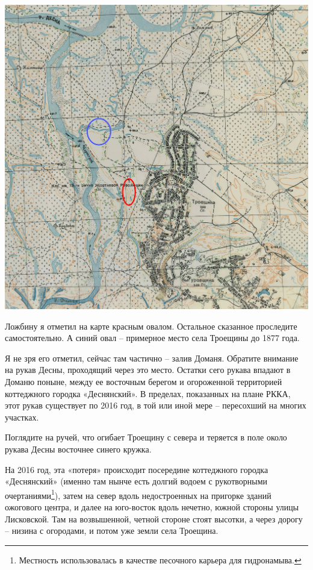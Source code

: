 \begin{center}
\includegraphics[width=\linewidth]{chast-gorodki/gnilusha/rkka.jpg}
\end{center}

Ложбину я отметил на карте красным овалом. Остальное сказанное проследите самостоятельно. А синий овал – примерное место села Троещины до 1877 года.

Я не зря его отметил, сейчас там частично – залив Доманя. Обратите внимание на рукав Десны, проходящий через это место. Остатки сего рукава впадают в Доманю поныне, между ее восточным берегом и огороженной территорией коттеджного городка «Деснянский». В пределах, показанных на плане РККА, этот рукав существует по 2016 год, в той или иной мере – пересохший на многих участках.

Поглядите на ручей, что огибает Троещину с севера и теряется в поле около рукава Десны восточнее синего кружка. 

На 2016 год, эта «потеря» происходит посередине коттеджного городка «Деснянский» (именно там нынче есть долгий водоем с рукотворными очертаниями\footnote{Местность использовалась в качестве песочного карьера для гидронамыва.}), затем на север вдоль недостроенных на пригорке зданий ожогового центра, и далее на юго-восток вдоль нечетно, южной стороны улицы Лисковской. Там на возвышенной, четной стороне стоят высотки, а через дорогу – низина с огородами, и потом уже земли села Троещина. 

